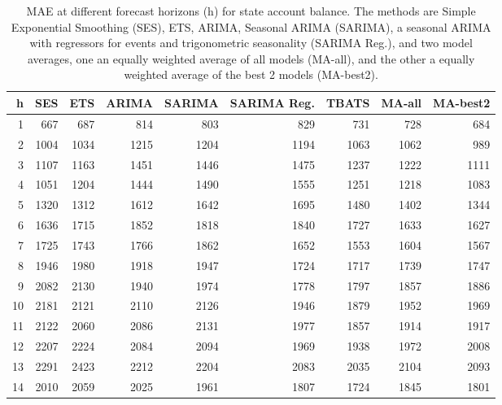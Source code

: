 \documentclass{article}
\begin{document}
\begin{table}[ht]
\centering
\begin{tabular}{rrrrrrrrr}
  \hline
h & SES & ETS & ARIMA & SARIMA & SARIMA Reg. & TBATS & MA-all & MA-best2 \\ 
  \hline
1 & 667 & 687 & 814 & 803 & 829 & 731 & 728 & 684 \\ 
  2 & 1004 & 1034 & 1215 & 1204 & 1194 & 1063 & 1062 & 989 \\ 
  3 & 1107 & 1163 & 1451 & 1446 & 1475 & 1237 & 1222 & 1111 \\ 
  4 & 1051 & 1204 & 1444 & 1490 & 1555 & 1251 & 1218 & 1083 \\ 
  5 & 1320 & 1312 & 1612 & 1642 & 1695 & 1480 & 1402 & 1344 \\ 
  6 & 1636 & 1715 & 1852 & 1818 & 1840 & 1727 & 1633 & 1627 \\ 
  7 & 1725 & 1743 & 1766 & 1862 & 1652 & 1553 & 1604 & 1567 \\ 
  8 & 1946 & 1980 & 1918 & 1947 & 1724 & 1717 & 1739 & 1747 \\ 
  9 & 2082 & 2130 & 1940 & 1974 & 1778 & 1797 & 1857 & 1886 \\ 
  10 & 2181 & 2121 & 2110 & 2126 & 1946 & 1879 & 1952 & 1969 \\ 
  11 & 2122 & 2060 & 2086 & 2131 & 1977 & 1857 & 1914 & 1917 \\ 
  12 & 2207 & 2224 & 2084 & 2094 & 1969 & 1938 & 1972 & 2008 \\ 
  13 & 2291 & 2423 & 2212 & 2204 & 2083 & 2035 & 2104 & 2093 \\ 
  14 & 2010 & 2059 & 2025 & 1961 & 1807 & 1724 & 1845 & 1801 \\ 
   \hline
\end{tabular}
\caption{MAE at different forecast horizons (h) for state account balance. The methods are Simple Exponential Smoothing (SES), ETS, ARIMA, Seasonal ARIMA (SARIMA), a seasonal ARIMA with regressors for events and trigonometric seasonality (SARIMA Reg.), and two model averages, one an equally weighted average of all models (MA-all), and the other a equally weighted average of the best 2 models (MA-best2).} 
\label{tab:maesab}
\end{table}
\end{document}
